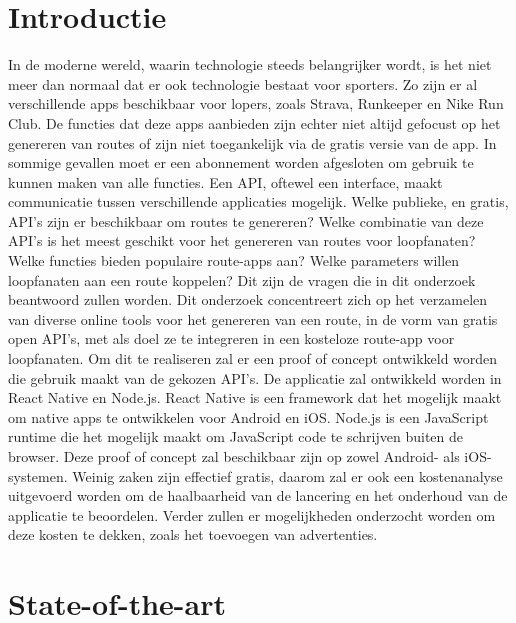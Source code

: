 
\section{Introductie}%
\label{sec:introductie}

In de moderne wereld,
waarin tech\-no\-lo\-gie \@ steeds belangrijker wordt,
is het niet meer dan normaal dat er ook technologie bestaat voor sporters.
Zo zijn er al verschillende apps beschikbaar voor lopers, zoals Strava, Runkeeper en Nike Run Club.
De functies dat deze apps aanbieden zijn echter niet altijd gefocust op het genereren van routes of zijn niet toegankelijk via de gratis versie van de app.
In sommige gevallen moet er een abonnement worden afgesloten om gebruik te kunnen maken van alle functies. Een API, oftewel een interface, maakt communicatie tussen verschillende applicaties mogelijk.
Welke publieke, en gratis, API's zijn er beschikbaar om routes te genereren? Welke combinatie van deze API's is het meest geschikt voor het genereren van routes voor loopfanaten? Welke functies bieden populaire route-apps aan? Welke parameters willen loopfanaten aan een route koppelen? Dit zijn de vragen die in dit onderzoek beantwoord zullen worden.
Dit onderzoek concentreert zich op het verzamelen van diverse online tools voor het genereren van een route, in de vorm van gratis open API's, met als doel ze te integreren in een kosteloze route-app voor loopfanaten.
Om dit te realiseren zal er een proof of concept ontwikkeld worden die gebruik maakt van de gekozen API's. De applicatie zal ontwikkeld worden in React Native en Node.js. React Native is een framework dat het mogelijk maakt om native apps te ontwikkelen voor Android en iOS\@. Node.js is een JavaScript runtime die het mogelijk maakt om JavaScript code te schrijven buiten de browser.
Deze proof of concept zal beschikbaar zijn op zowel Android- als iOS-systemen. Weinig zaken zijn effectief gratis, daarom zal er ook een kostenanalyse uitgevoerd worden om de haalbaarheid van de lancering en het onderhoud van de applicatie te beoordelen.
Verder zullen er mogelijkheden onderzocht worden om deze kosten te dekken, zoals het toevoegen van advertenties.



\section{State-of-the-art}%
\label{sec:state-of-the-art}

